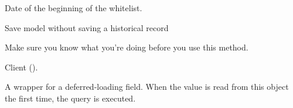 \documentclass[letterpaper,10pt,english]{sphinxmanual}
\begin{document}
\begin{fulllineitems}

\begin{fulllineitems}
\label{\detokenize{modules/models:users.models.WhiteListHistory.paymentDate}}
Date of the beginning of the whitelist.

\end{fulllineitems}


\begin{fulllineitems}
\label{\detokenize{modules/models:users.models.WhiteListHistory.save_without_historical_record}}
Save model without saving a historical record

Make sure you know what you’re doing before you use this method.

\end{fulllineitems}


\begin{fulllineitems}
\label{\detokenize{modules/models:users.models.WhiteListHistory.user}}
Client ().

\end{fulllineitems}


\begin{fulllineitems}
\label{\detokenize{modules/models:users.models.WhiteListHistory.user_id}}
A wrapper for a deferred-loading field. When the value is read from this
object the first time, the query is executed.

\end{fulllineitems}


\end{fulllineitems}
\end{document}
